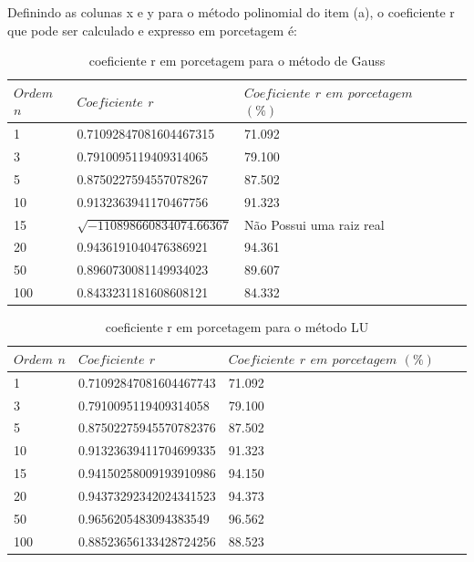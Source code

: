 \documentclass{article}
\begin{document}
\text Definindo as colunas x e y para o método polinomial do item (a), o coeficiente r que pode ser calculado e expresso em porcetagem é:
\begin{table}[h]
\centering
  \begin{tabular}{l|l|lll}
    $Ordem$ $n$ & $Coeficiente$ $r$ & $Coeficiente$ $r$ $em$ $porcetagem$ $(\%)$\\
    \hline
    1 &  0.71092847081604467315 & 71.092\\
    
    3 & 0.7910095119409314065 & 79.100\\
    
    5 & 0.8750227594557078267  & 87.502 \\
    
    10 & 0.9132363941170467756 & 91.323\\
    
    15 &  $\sqrt{-110898660834074.66367}$    & Não Possui uma raiz real\\
    
    20 & 0.9436191040476386921 & 94.361\\
    
    50 & 0.8960730081149934023 & 89.607\\
    
    100 & 0.8433231181608608121 & 84.332 \\
    \hline
  \end{tabular}
  \caption{coeficiente r em porcetagem para o método de Gauss}
\end{table}

\begin{table}[h]
\centering
  \begin{tabular}{l|l|lll}
    $Ordem$ $n$ & $Coeficiente$ $r$ & $Coeficiente$ $r$ $em$ $porcetagem$ $(\%)$\\
    \hline
    1 &  0.71092847081604467743 & 71.092\\
    
    3 & 0.7910095119409314058 & 79.100\\
    
    5 & 0.87502275945570782376  & 87.502 \\
    
    10 & 0.91323639411704699335 & 91.323\\
    
    15 & 0.94150258009193910986    & 94.150\\
    
    20 & 0.94373292342024341523 & 94.373\\
    
    50 & 0.9656205483094383549 & 96.562\\
    
    100 & 0.88523656133428724256 & 88.523 \\
    \hline
  \end{tabular}
  \caption{coeficiente r em porcetagem para o método LU}
\end{table}
\end{document}
